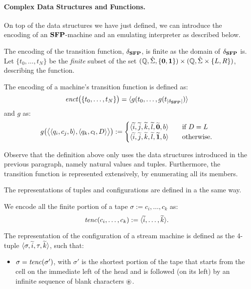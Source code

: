 \begin{conditional}{\appendixorsup}
  \paragraph{Complex Data Structures
  and Functions.}
  On top of the data structures we have
  just defined, we can introduce
  the encoding of an $\mathbf{SFP}$-machine
  and an emulating
  interpreter as described below.


  The encoding of the transition function,
  $\delta_{\mathbf{SFP}}$, is finite as the domain
  of $\delta_{\mathbf{SFP}}$ is.
  Let $\{t_0,\dots, t_N\}$
  be the \emph{finite} subset of the
  set
  $(\mathbb{Q}, \hat{\Sigma}, \{\mathbf{0},\mathbf{1}\})
  \times (\mathbb{Q}, \hat{\Sigma} \times \{L,R\})$,
  describing the function.



  \begin{defn}\label{def:encTrans}
  The encoding of a machine's transition function is defined as:
  $$
  \mathit{enct}\big(\{t_0,\dots, t_N\}\big)=  \langle g(t_0,
  \dots,g(t_{|\delta_{\mathbf{SFP}}|})\rangle
  $$
  and $g$ as:
  $$
  g\big(\big\langle\langle q_i,c_j,b\rangle,
  \langle q_k,c_l,D\rangle\big\rangle\big) :=
  \begin{cases}
  \langle {\widetilde{i}, \widetilde{j},
  \widetilde{k}, \widetilde{l}}, \widetilde{\mathbf{0}}, b\rangle
  \ \ \ &\text{if } D=L \\
  \langle {\widetilde{i}, \widetilde{j},
  \widetilde{k}, \widetilde{l}}, \widetilde{\mathbf{1}}, b\rangle
  \ \ \ &\text{otherwise.}
  \end{cases}
  $$
  \end{defn}
  \noindent
  Observe that the definition
  above only uses the data structures
  introduced in the previous paragraph,
  namely natural values and tuples.
  Furthermore, the transition function
  is represented extensively, by
  enumerating all its members.

  The representations of
  tuples and configurations
  are defined in a the same way.

  \begin{defn}\label{def:encTape}
  We encode all the finite portion of a tape
  $\sigma:= c_i, \dots, c_k$ as:
  $$
  \mathit{tenc}(c_i,\dots, c_k) := \langle {\widetilde{i},
  \dots, \widetilde{k}}\rangle.
  $$
  \end{defn}



  \begin{defn}\label{def:encConf}
  The representation of the configuration
  of a stream machine is defined as the
  4-tuple $\langle \sigma, {\widetilde{i}},
  \tau, {\widetilde{k}}\rangle$, such that:
  \begin{itemize}
  \itemsep0em
  \item $\sigma=\mathit{tenc}(\sigma')$,
  {with $\sigma'$ is the shortest portion of the
  tape that starts from the cell on
  the immediate left of the head and is followed
  (on its left) by an infinite sequence of blank characters
  $\circledast$.}


\end{itemize}
\end{defn}
\end{conditional}
